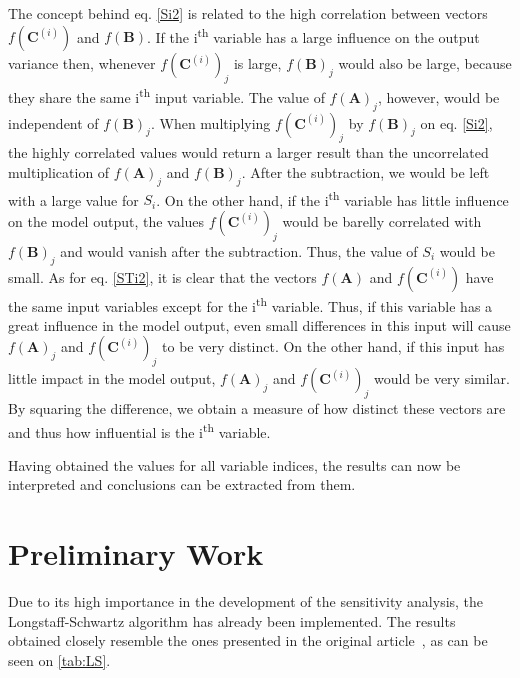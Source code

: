 \documentclass[a4paper,twocolumn,aps,prd,longbibliography,superscriptaddress]{revtex4-1}
\begin{document}
The concept behind eq. \eqref{Si2} is related to the high correlation between vectors $f(\mathbf{C}^{(i)})$ and $f(\mathbf{B})$. If the i\textsuperscript{th} variable has a large influence on the output variance then, whenever $f(\mathbf{C}^{(i)})_j$ is large, $f(\mathbf{B})_j$ would also be large, because they share the same i\textsuperscript{th} input variable. The value of $f(\mathbf{A})_j$, however, would be independent of $f(\mathbf{B})_j$. When multiplying $f(\mathbf{C}^{(i)})_j$ by $f(\mathbf{B})_j$ on eq. \eqref{Si2}, the highly correlated values would return a larger result than the uncorrelated multiplication of $f(\mathbf{A})_j$ and $f(\mathbf{B})_j$. After the subtraction, we would be left with a large value for $S_i$.
On the other hand, if the i\textsuperscript{th} variable has little influence on the model output, the values $f(\mathbf{C}^{(i)})_j$ would be barelly correlated with $f(\mathbf{B})_j$ and would vanish after the subtraction. Thus, the value of $S_i$ would be small.
As for eq. \eqref{STi2}, it is clear that the vectors $f(\mathbf{A})$ and $f(\mathbf{C}^{(i)})$ have the same input variables except for the i\textsuperscript{th} variable. Thus, if this variable has a great influence in the model output, even small differences in this input will cause $f(\mathbf{A})_j$ and $f(\mathbf{C}^{(i)})_j$ to be very distinct. On the other hand, if this input has little impact in the model output, $f(\mathbf{A})_j$ and $f(\mathbf{C}^{(i)})_j$ would be very similar.
By squaring the difference, we obtain a measure of how distinct these vectors are and thus how influential is the i\textsuperscript{th} variable.

Having obtained the values for all variable indices, the results can now be interpreted and conclusions can be extracted from them.

\section{Preliminary Work}
Due to its high importance in the development of the sensitivity analysis, the Longstaff-Schwartz algorithm has already been implemented. The results obtained closely resemble the ones presented in the original article~\cite{Longstaff}, as can be seen on \autoref{tab:LS}.
\end{document}
